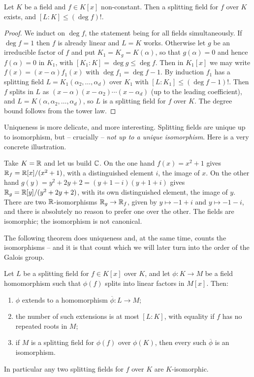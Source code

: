 \documentclass[a4paper]{scrartcl}
\begin{document}
\begin{theorem}\label{thm:splitexist}
	Let $K$ be a field and $f \in K[x]$ non-constant. Then a splitting field for $f$ over $K$ exists, and $[L:K] \leq (\deg f)!$.
\end{theorem}

\begin{proof}
	We induct on $\deg f$, the statement being for all fields simultaneously. If $\deg f = 1$ then $f$ is already linear and $L = K$ works. Otherwise let $g$ be an irreducible factor of $f$ and put $K_1 = K_g = K(\alpha)$, so that $g(\alpha) = 0$ and hence $f(\alpha) = 0$ in $K_1$, with $[K_1 : K] = \deg g \leq \deg f$. Then in $K_1[x]$ we may write $f(x) = (x-\alpha)f_1(x)$ with $\deg f_1 = \deg f - 1$. By induction $f_1$ has a splitting field $L = K_1(\alpha_2, \dots, \alpha_d)$ over $K_1$ with $[L:K_1] \leq (\deg f - 1)!$. Then $f$ splits in $L$ as $(x-\alpha)(x-\alpha_2)\cdots(x-\alpha_d)$ (up to the leading coefficient), and $L = K(\alpha, \alpha_2, \dots, \alpha_d)$, so $L$ is a splitting field for $f$ over $K$. The degree bound follows from the tower law.
\end{proof}

Uniqueness is more delicate, and more interesting. Splitting fields are unique up to isomorphism, but -- crucially -- \emph{not up to a unique isomorphism}. Here is a very concrete illustration.

\begin{example}
	Take $K = \mathbb{R}$ and let us build $\mathbb{C}$. On the one hand $f(x) = x^2+1$ gives $\mathbb{R}_f = \mathbb{R}[x]/(x^2+1)$, with a distinguished element $i$, the image of $x$. On the other hand $g(y) = y^2 + 2y + 2 = (y+1-i)(y+1+i)$ gives $\mathbb{R}_g = \mathbb{R}[y]/(y^2+2y+2)$, with its own distinguished element, the image of $y$. There are two $\mathbb{R}$-isomorphisms $\mathbb{R}_g \to \mathbb{R}_f$, given by $y \mapsto -1 + i$ and $y \mapsto -1 - i$, and there is absolutely no reason to prefer one over the other. The fields are isomorphic; the isomorphism is not canonical.
\end{example}

The following theorem does uniqueness and, at the same time, counts the isomorphisms -- and it is that count which we will later turn into the order of the Galois group.

\begin{theorem}\label{thm:splituniq}
	Let $L$ be a splitting field for $f \in K[x]$ over $K$, and let $\phi : K \to M$ be a field homomorphism such that $\phi(f)$ splits into linear factors in $M[x]$. Then:
	\begin{enumerate}[label=(\roman*)]
		\item $\phi$ extends to a homomorphism $\overline\phi : L \to M$;
		\item the number of such extensions is at most $[L:K]$, with equality if $f$ has no repeated roots in $M$;
		\item if $M$ is a splitting field for $\phi(f)$ over $\phi(K)$, then every such $\overline\phi$ is an isomorphism.
	\end{enumerate}
	In particular any two splitting fields for $f$ over $K$ are $K$-isomorphic.
\end{theorem}
\end{document}
